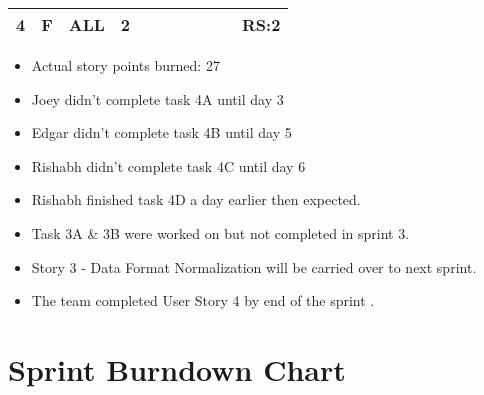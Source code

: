 \documentclass[12pt]{article}
\begin{document}
\begin{table}[H]
\begin{tabular}{@{}c|c|c|c|ccccccc@{}}
4     & F    & ALL        & 2                                                      &                                                 &                                                 &                                                  &                                                  &                                                  &                                                  & RS:2                                             \\ \bottomrule
\end{tabular}
\end{table}

\begin{itemize}%
\item Actual story points burned: 27
\item Joey didn't complete task 4A until day 3
\item Edgar didn't complete task 4B until day 5
\item Rishabh didn't complete task 4C until day 6
\item Rishabh finished task 4D a day earlier then expected.
\item Task 3A \& 3B were worked on but not completed in sprint 3. 
\item Story 3 - Data Format Normalization will be carried over to next sprint.
\item The team completed User Story 4 by end of the sprint . 
\end{itemize}

\section{Sprint Burndown Chart}


\newpage


\end{document}
